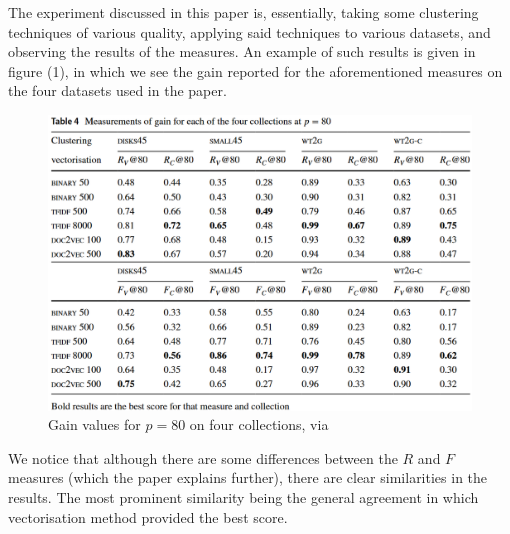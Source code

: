 \documentclass[sigconf,authorversion,nonacm]{acmart}
\begin{document}
The experiment discussed in this paper is, essentially, taking some clustering techniques of various quality, applying
said techniques to various datasets, and observing the results of the measures. An example of such results is given in
figure (1), in which we see the gain reported for the aforementioned measures on the four datasets used in the paper.
\begin{figure}[] \centering \includegraphics[width=\linewidth]{gain.png} \caption{Gain values for $p=80$ on four
collections, via \cite{Yuan2022}} \end{figure} We notice that although there are some differences between the $R$ and
$F$ measures (which the paper explains further), there are clear similarities in the results. The most prominent
similarity being the general agreement in which vectorisation method provided the best score.
\end{document}
